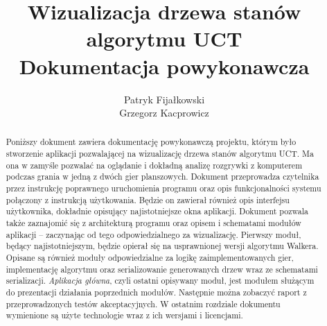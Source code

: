 \documentclass{article}
\title{
	Wizualizacja drzewa stanów algorytmu UCT \\
	\large Dokumentacja powykonawcza}
\author{Patryk Fijałkowski \\ Grzegorz Kacprowicz}
\newcommand{\modulename}[1]{\textit{#1}}
\begin{document}
\begin{titlingpage}
	\maketitle
	\vspace{3cm}
	\begin{abstract}
		Poniższy dokument zawiera dokumentację powykonawczą projektu, którym było stworzenie aplikacji pozwalającej na wizualizację drzewa stanów algorytmu UCT. Ma ona w zamyśle pozwalać na oglądanie i dokładną analizę rozgrywki z komputerem podczas grania w jedną z dwóch gier planszowych. Dokument przeprowadza czytelnika przez instrukcję poprawnego uruchomienia programu oraz opis funkcjonalności systemu połączony z instrukcją użytkowania. Będzie on zawierał również opis interfejsu użytkownika, dokładnie opisujący najistotniejsze okna aplikacji. Dokument pozwala także zaznajomić się z architekturą programu oraz opisem i schematami modułów aplikacji – zaczynając od tego odpowiedzialnego za wizualizację. Pierwszy moduł, będący najistotniejszym, będzie opierał się na usprawnionej wersji algorytmu Walkera. Opisane są również moduły odpowiedzialne za logikę zaimplementowanych gier, implementację algorytmu oraz serializowanie generowanych drzew wraz ze schematami serializacji. \modulename{Aplikacja główna}, czyli ostatni opisywany moduł, jest modułem służącym do prezentacji działania poprzednich modułów. Następnie można zobaczyć raport z przeprowadzonych testów akceptacyjnych. W ostatnim rozdziale dokumentu wymienione są użyte technologie wraz z ich wersjami i licencjami.
	\end{abstract}
\end{titlingpage}

\begin{versionhistory}
\end{versionhistory}
\tableofcontents
	
\end{document}
